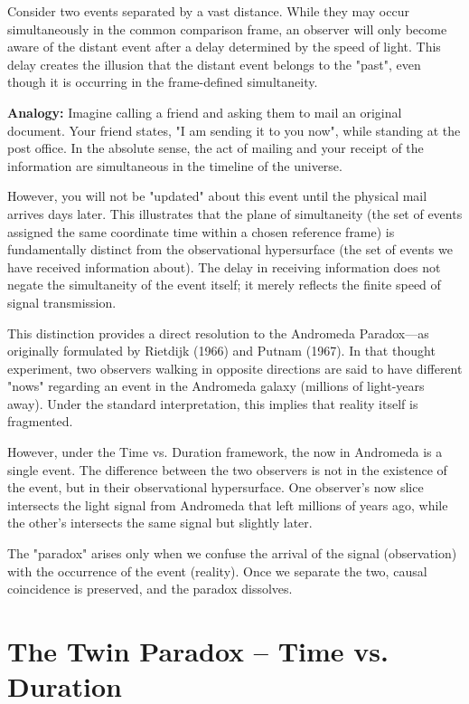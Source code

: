 \documentclass[a4paper,fleqn]{cas-sc}
\begin{document}
	Consider two events separated by a vast distance. While they may occur simultaneously in the common comparison frame, an observer will only become aware of the distant event after a delay determined by the speed of light. This delay creates the illusion that the distant event belongs to the "past", even though it is occurring in the frame-defined simultaneity.

		\textbf{Analogy:} Imagine calling a friend and asking them to mail an original document. Your friend states, "I am sending it to you now", while standing at the post office. In the absolute sense, the act of mailing and your receipt of the information are simultaneous in the timeline of the universe. 

However, you will not be "updated" about this event until the physical mail arrives days later.
	This illustrates that the plane of simultaneity (the set of events assigned the same coordinate time within a chosen reference frame) is fundamentally distinct from the observational hypersurface (the set of events we have received information about). The delay in receiving information does not negate the simultaneity of the event itself; it merely reflects the finite speed of signal transmission.

	This distinction provides a direct resolution to the Andromeda Paradox—as originally formulated by Rietdijk (1966) and Putnam (1967). In that thought experiment, two observers walking in opposite directions are said to have different "nows" regarding an event in the Andromeda galaxy (millions of light-years away). Under the standard interpretation, this implies that reality itself is fragmented.

However, under the Time vs. Duration framework, the now in Andromeda is a single event. The difference between the two observers is not in the existence of the event, but in their observational hypersurface. One observer's now slice intersects the light signal from Andromeda that left millions of years ago, while the other's intersects the same signal but slightly later.

	The "paradox" arises only when we confuse the arrival of the signal (observation) with the occurrence of the event (reality). Once we separate the two, causal coincidence is preserved, and the paradox dissolves.

\section{The Twin Paradox – Time vs. Duration}\label{sec3}
\end{document}
